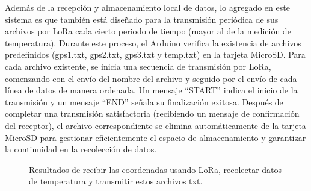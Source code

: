\begin{itemize}
Además de la recepción y almacenamiento local de datos, lo agregado en este sistema es que también está diseñado para la transmisión periódica de sus archivos por LoRa cada cierto periodo de tiempo (mayor al de la medición de temperatura). Durante este proceso, el Arduino verifica la existencia de archivos predefinidos (gps1.txt, gps2.txt, gps3.txt y temp.txt) en la tarjeta MicroSD. Para cada archivo existente, se inicia una secuencia de transmisión por LoRa, comenzando con el envío del nombre del archivo y seguido por el envío de cada línea de datos de manera ordenada. Un mensaje ``START'' indica el inicio de la transmisión y un mensaje ``END'' señala su finalización exitosa. Después de completar una transmisión satisfactoria (recibiendo un mensaje de confirmación del receptor), el archivo correspondiente se elimina automáticamente de la tarjeta MicroSD para gestionar eficientemente el espacio de almacenamiento y garantizar la continuidad en la recolección de datos.
\begin{figure}[H]
    \begin{minipage}{\textwidth}
        \centering
        \begin{minipage}{\textwidth}
            \centering
            \end{minipage}
    \end{minipage}
\end{figure}
\newpage
\begin{figure}[H]
    \begin{minipage}{\textwidth}
        \centering
        \begin{minipage}{\textwidth}
            \centering
        \end{minipage}
    \end{minipage}
    \caption{Resultados de recibir las coordenadas usando LoRa, recolectar datos de temperatura y transmitir estos archivos txt.}
\end{figure}


\end{itemize}
